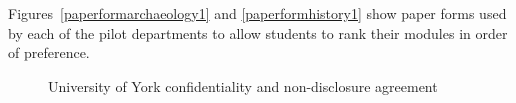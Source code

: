 \documentclass[draft]{scrartcl}
\begin{document}
Figures~\ref{paperformarchaeology1} and \ref{paperformhistory1} show
paper forms used by each of the pilot departments to allow students to rank
their modules in order of preference.

\begin{figure}
  \begin{center}
  \end{center}
  \caption{University of York confidentiality and non-disclosure agreement}
  \label{confidentialitynda}
\end{figure}
\end{document}
